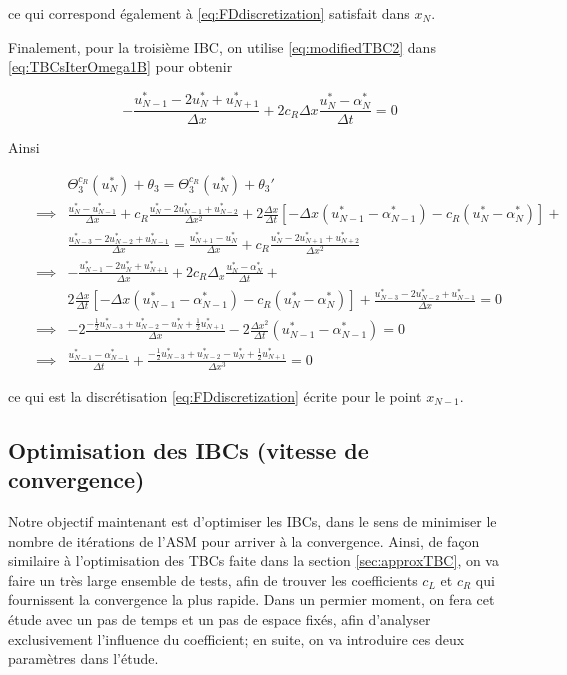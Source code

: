 \noindent ce qui correspond également à \eqref{eq:FDdiscretization} satisfait dans $x_N$.

\indent Finalement, pour la troisième IBC, on utilise \eqref{eq:modifiedTBC2} dans \eqref{eq:TBCsIterOmega1B} pour obtenir

\begin{equation*}
-\frac{u_{N-1}^* - 2 u_{N}^* + u_{N+1}^*}{\Delta x} + 2c_R\Delta x\frac{u_N^* - \alpha_N^*}{\Delta t} = 0 
\end{equation*}

\indent Ainsi

\begingroup
\begin{align*}
\label{eq:modifiedTBC3}
&&  &\Theta_3^{c_R}(u_N^*) + \theta_3 = \Theta_3^{c_R}(u_N^*) + \theta_3'    \\
&& \implies & \frac{u_N^* - u_{N-1}^*}{\Delta x} + c_R \frac{u_N^* - 2u_{N-1}^* + u_{N-2}^*}{\Delta x^2} + 2\frac{\Delta x}{\Delta t}  \left[-\Delta x(u_{N-1}^* - \alpha_{N-1}^*) - c_R (u_N^* - \alpha_N^*) \right] + \\
&&   & 			\frac{u_{N-3}^* - 2u_{N-2}^* + u_{N-1}^*}{\Delta x}  =  \frac{u_{N+1}^* - u_{N}^*}{\Delta x} + c_R \frac{u_N^* - 2u_{N+1}^* + u_{N+2}^*}{\Delta x^2} \\
&&  \implies &  -\frac{u_{N-1}^* - 2 u_{N}^* + u_{N+1}^*}{\Delta x} + 2c_R\Delta_x\frac{u_N^* - \alpha_N^*}{\Delta t} + \\
&&   & 2\frac{\Delta x}{\Delta t} \left[-\Delta x(u_{N-1}^* - \alpha_{N-1}^*) - c_R(u_N^* - \alpha_N^*) \right] + \frac{u_{N-3}^* - 2u_{N-2}^* + u_{N-1}^*}{\Delta x} = 0 \\
&& \implies  & -2\frac{-\frac{1}{2}u_{N-3}^* + u_{N-2}^* - u_{N}^* + \frac{1}{2}u_{N+1}^* }{\Delta x} - 2\frac{\Delta x^2}{\Delta t}(u_{N-1}^* - 					\alpha_{N-1}^*) = 0 \\
&& \implies &  \frac{u_{N-1}^* - \alpha_{N-1}^*}{\Delta t} + \frac{-\frac{1}{2}u_{N-3}^* + u_{N-2}^* - u_{N}^* + \frac{1}{2}u_{N+1}^* }{\Delta x ^3} = 0
\end{align*}
\endgroup

\noindent ce qui est la discrétisation \eqref{eq:FDdiscretization} écrite pour le point $x_{N-1}$.

\subsection{Optimisation des IBCs (vitesse de convergence)}

\indent Notre objectif maintenant est d'optimiser les IBCs, dans le sens de minimiser le nombre de itérations de l'ASM pour arriver à la convergence.   Ainsi, de façon similaire à l'optimisation des TBCs faite dans la section \ref{sec:approxTBC}, on va faire un très large ensemble de tests, afin de trouver les coefficients $c_L$ et $c_R$ qui fournissent la convergence la plus rapide. Dans un permier moment, on fera cet étude avec un pas de temps et un pas de espace fixés, afin d'analyser exclusivement l'influence du coefficient; en suite, on va introduire ces deux paramètres dans l'étude.

